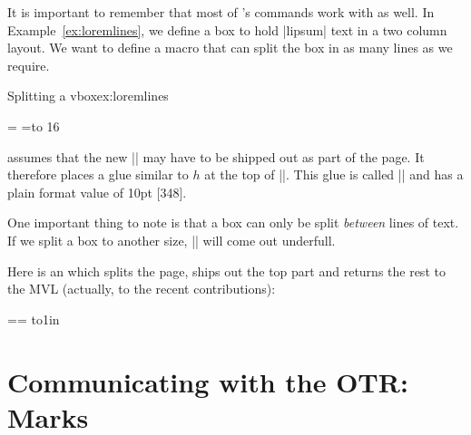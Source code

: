 \begin{macro}{\loremlines}
It is important to remember that most of \tex's commands work with \latex as well. In Example~\ref{ex:loremlines}, we define a box to hold |lipsum| text in a two column layout. We want to define a macro that can split the box in as many lines as we require. 
\end{macro}

\begin{texexample}{Splitting a vbox}{ex:loremlines}
\newbox\one
\newbox\two
\long\gdef\loremlines#1#2{%
   \setbox\one=\vbox {#2}
   \setbox\two=\vsplit\one to #1\baselineskip
   \unvbox\two
   \gdef\boxone{#2}
}
\begin{multicols}{2}
\small
\loremlines{16}{\lipsum[1-2]}
\end{multicols}
\boxone
\end{texexample}


\tex assumes that the new || may have to
be shipped out as part of the page. It therefore
places a glue similar to $h$ at the top of ||.
This glue is called |\splittopskip| and has a plain
format value of 10pt [348].

One important thing to note is that a box can only be split \textit{between} lines of text. 
If we split a box to another size, || will come out underfull.

Here is an \otr which splits the page, ships
out the top part and returns the rest to the MVL
(actually, to the recent contributions):

\begin{teXXX}
\output={= to1in
\shipout{} }
\end{teXXX}






\section{Communicating with the OTR: Marks}

